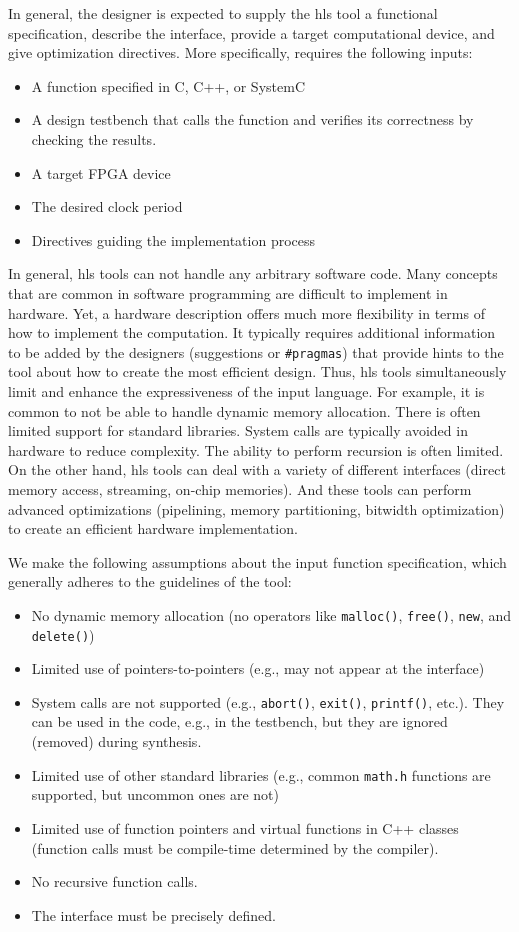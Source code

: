 In general, the designer is expected to supply the \gls{hls} tool a functional specification, describe the interface, provide a target computational device, and give optimization directives. More specifically, \VHLS requires the following inputs:
\begin{itemize}
\item A function specified in C, C++, or SystemC 
\item A design testbench that calls the function and verifies its correctness by checking the results.
\item A target FPGA device
\item The desired clock period
\item Directives guiding the implementation process
\end{itemize}

In general, \gls{hls} tools can not handle any arbitrary software code. Many concepts that are common in software programming are difficult to implement in hardware. Yet, a hardware description offers much more flexibility in terms of how to implement the computation. It typically requires additional information to be added by the designers (suggestions or \lstinline|#pragmas|) that provide hints to the tool about how to create the most efficient design. Thus, \gls{hls} tools simultaneously limit and enhance the expressiveness of the input language. For example, it is common to not be able to handle dynamic memory allocation. There is often limited support for standard libraries. System calls are typically avoided in hardware to reduce complexity. The ability to perform recursion is often limited. On the other hand, \gls{hls} tools can deal with a variety of different interfaces (direct memory access, streaming, on-chip memories). And these tools can perform advanced optimizations (pipelining, memory partitioning, bitwidth optimization) to create an efficient hardware implementation. 

We make the following assumptions about the input function specification, which generally adheres to the guidelines of the \VHLS tool:
\begin{itemize}
\item No dynamic memory allocation (no operators like \lstinline|malloc()|, \lstinline|free()|, \lstinline|new|, and \lstinline|delete()|)
\item Limited use of pointers-to-pointers (e.g., may not appear at the interface)
\item System calls are not supported (e.g., \lstinline|abort()|, \lstinline|exit()|, \lstinline|printf()|, etc.). They can be used in the code, e.g., in the testbench, but they are ignored (removed) during synthesis.
\item Limited use of other standard libraries (e.g., common \lstinline|math.h| functions are supported, but uncommon ones are not)
\item Limited use of function pointers and virtual functions in C++ classes (function calls must be compile-time determined by the compiler).
\item No recursive function calls.
\item The interface must be precisely defined.
\end{itemize}

